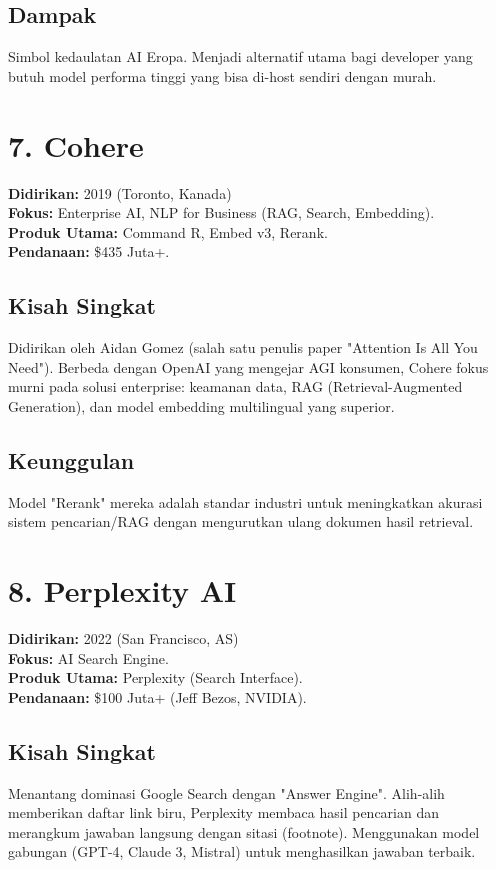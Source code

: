 \subsection*{Dampak}
Simbol kedaulatan AI Eropa. Menjadi alternatif utama bagi developer yang butuh model performa tinggi yang bisa di-host sendiri dengan murah.

\section{7. Cohere}
\textbf{Didirikan:} 2019 (Toronto, Kanada) \\
\textbf{Fokus:} Enterprise AI, NLP for Business (RAG, Search, Embedding). \\
\textbf{Produk Utama:} Command R, Embed v3, Rerank. \\
\textbf{Pendanaan:} \$435 Juta+.

\subsection*{Kisah Singkat}
Didirikan oleh Aidan Gomez (salah satu penulis paper "Attention Is All You Need"). Berbeda dengan OpenAI yang mengejar AGI konsumen, Cohere fokus murni pada solusi enterprise: keamanan data, RAG (Retrieval-Augmented Generation), dan model embedding multilingual yang superior.

\subsection*{Keunggulan}
Model "Rerank" mereka adalah standar industri untuk meningkatkan akurasi sistem pencarian/RAG dengan mengurutkan ulang dokumen hasil retrieval.

\section{8. Perplexity AI}
\textbf{Didirikan:} 2022 (San Francisco, AS) \\
\textbf{Fokus:} AI Search Engine. \\
\textbf{Produk Utama:} Perplexity (Search Interface). \\
\textbf{Pendanaan:} \$100 Juta+ (Jeff Bezos, NVIDIA).

\subsection*{Kisah Singkat}
Menantang dominasi Google Search dengan "Answer Engine". Alih-alih memberikan daftar link biru, Perplexity membaca hasil pencarian dan merangkum jawaban langsung dengan sitasi (footnote). Menggunakan model gabungan (GPT-4, Claude 3, Mistral) untuk menghasilkan jawaban terbaik.

